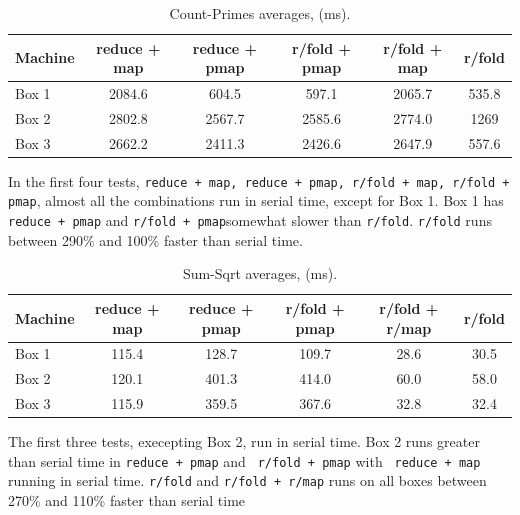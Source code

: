 \documentclass[12pt]{article}
\newcommand{\clocode}[1]{{\texttt {#1}}}
\begin{document}
\begin{table}[h!]
\begin{center}
\begin{tabular}{|l|c|c|c|c|c|}
\hline
Machine & reduce + map & reduce + pmap & r/fold + pmap & r/fold + map & r/fold\\
\hline
Box 1 & 2084.6 & 604.5 & 597.1 & 2065.7 & 535.8\\
Box 2 & 2802.8 & 2567.7 & 2585.6 & 2774.0 & 1269 \\
Box 3 & 2662.2 & 2411.3 & 2426.6 & 2647.9 & 557.6\\
\hline
\end{tabular}
\end{center}
\caption{Count-Primes averages, (ms).}\label{table:sum-primes}
\end{table}

 In the first four tests, \clocode{reduce + map, reduce + pmap, r/fold + map, r/fold + pmap}, almost all the combinations run in serial time, except for Box 1. Box 1 has \clocode{reduce + pmap} and \clocode{r/fold + pmap}somewhat slower than \clocode{r/fold}. \clocode{r/fold} runs between 290\% and 100\% faster than serial time.


\begin{table}[h!]
\begin{center}
\begin{tabular}{|l|c|c|c|c|c|}
\hline
Machine & reduce + map & reduce + pmap & r/fold + pmap & r/fold + r/map & r/fold\\
\hline
Box 1 & 115.4 & 128.7 & 109.7 & 28.6 & 30.5\\
Box 2 & 120.1 & 401.3 & 414.0 & 60.0 & 58.0 \\
Box 3 & 115.9 & 359.5 & 367.6 & 32.8 & 32.4\\
\hline
\end{tabular}
\end{center}
\caption{Sum-Sqrt averages, (ms).}\label{table:sum-primes}
\end{table}

The first three tests, execepting Box 2, run in serial time. Box 2 runs greater than serial time in \clocode{reduce + pmap} and \clocode{ r/fold + pmap} with \clocode{ reduce + map} running in serial time. \clocode{r/fold} and \clocode{r/fold + r/map} runs on all boxes between 270\% and 110\% faster than serial time
\end{document}
